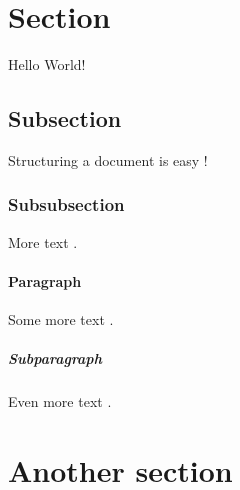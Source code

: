 \documentclass{article}
\begin{document}
	\section{Section}
	Hello World!
	\subsection{Subsection}
	Structuring a document is easy !
	\subsubsection{Subsubsection}
	More text .
	\paragraph{Paragraph}
	Some more text .
	\subparagraph{Subparagraph}
	Even more text .
	\section{Another section}
\end{document}
